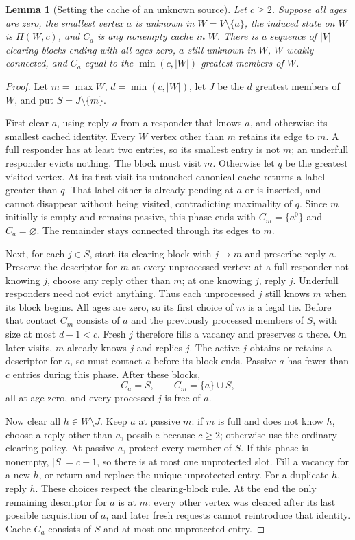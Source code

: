 \documentclass[11pt]{article}
\newtheorem{lemma}[theorem]{Lemma}
\begin{document}
\begin{lemma}[Setting the cache of an unknown source]
\label{lem:extend}
Let $c\ge2$. Suppose all ages are zero, the smallest vertex $a$
is unknown in $W=V\setminus\{a\}$, the induced state on $W$
is $H(W,c)$, and $C_a$ is any nonempty cache in $W$.
There is a sequence of $|V|$ clearing blocks ending with all
ages zero, $a$ still unknown in $W$, $W$ weakly connected,
and $C_a$ equal to the $\min(c,|W|)$ greatest members of $W$.
\end{lemma}
\begin{proof}
Let $m=\max W$, $d=\min(c,|W|)$, let $J$ be the $d$
greatest members of $W$, and put $S=J\setminus\{m\}$.

First clear $a$, using reply $a$ from a responder that knows
$a$, and otherwise its smallest cached identity.
Every $W$ vertex other than $m$ retains its edge to $m$.
A full responder has at least two entries, so its smallest
entry is not $m$; an underfull responder evicts nothing.
The block must visit $m$. Otherwise let $q$ be the greatest
visited vertex. At its first visit its untouched canonical cache
returns a label greater than $q$. That label either is already
pending at $a$ or is inserted, and cannot disappear without being
visited, contradicting maximality of $q$.
Since $m$ initially is empty and remains passive, this phase
ends with $C_m=\{a^0\}$ and $C_a=\varnothing$.
The remainder stays connected through its edges to $m$.

Next, for each $j\in S$, start its clearing block with $j\to m$
and prescribe reply $a$. Preserve the descriptor for $m$ at every
unprocessed vertex: at a full responder not knowing $j$, choose
any reply other than $m$; at one knowing $j$, reply $j$.
Underfull responders need not evict anything.
Thus each unprocessed $j$ still knows $m$ when its block begins.
All ages are zero, so its first choice of $m$ is a legal tie.
Before that contact $C_m$ consists of $a$ and the previously
processed members of $S$, with size at most $d-1<c$.
Fresh $j$ therefore fills a vacancy and preserves $a$ there.
On later visits, $m$ already knows $j$ and replies $j$.
The active $j$ obtains or retains a descriptor for $a$, so must
contact $a$ before its block ends.
Passive $a$ has fewer than $c$ entries during this phase.
After these blocks,
\[
 C_a=S,\qquad C_m=\{a\}\cup S,
\]
all at age zero, and every processed $j$ is free of $a$.

Now clear all $h\in W\setminus J$.
Keep $a$ at passive $m$: if $m$ is full and does not know $h$,
choose a reply other than $a$, possible because $c\ge2$;
otherwise use the ordinary clearing policy.
At passive $a$, protect every member of $S$.
If this phase is nonempty, $|S|=c-1$, so there is at most one
unprotected slot. Fill a vacancy for a new $h$, or return and
replace the unique unprotected entry. For a duplicate $h$,
reply $h$. These choices respect the clearing-block rule.
At the end the only remaining descriptor for $a$ is at $m$:
every other vertex was cleared after its last possible
acquisition of $a$, and later fresh requests cannot reintroduce
that identity. Cache $C_a$ consists of $S$ and at most one
unprotected entry.


\end{proof}
\end{document}
